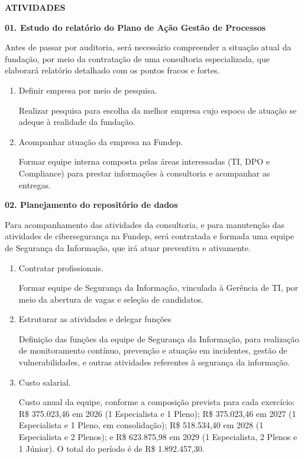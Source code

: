 \documentclass[12pt,a4paper]{article}
\newcommand{\secao}[1]{%
  \par\vspace{6pt}%
  {\noindent\bfseries\color{azulTitulo}\fontsize{13}{16}\selectfont #1}%
  \par\vspace{2pt}%
}
\newcommand{\atividade}[1]{%
  \par{\bfseries\color{azulAtividade}#1}\par
}
\begin{document}
\secao{ATIVIDADES}

\atividade{01. Estudo do relatório do Plano de Ação Gestão de Processos}

Antes de passar por auditoria, será necessário compreender a situação atual da fundação, por meio da contratação de uma consultoria especializada, que elaborará relatório detalhado com os pontos fracos e fortes.

\begin{enumerate}
  \item Definir empresa por meio de pesquisa.

        Realizar pesquisa para escolha da melhor empresa cujo espoco de atuação se adeque à realidade da fundação.
  \item Acompanhar atuação da empresa na Fundep.

        Formar equipe interna composta pelas áreas interessadas (TI, DPO e Compliance) para prestar informações à consultoria e acompanhar as entregas.
\end{enumerate}

\atividade{02. Planejamento do repositório de dados}

Para acompanhamento das atividades da consultoria, e para manutenção das atividades de cibersegurança na Fundep, será contratada e formada uma equipe de Segurança da Informação, que irá atuar preventiva e ativamente.

\begin{enumerate}
  \item Contratar profissionais.

        Formar equipe de Segurança da Informação, vinculada à Gerência de TI, por meio da abertura de vagas e seleção de candidatos.
  \item Estruturar as atividades e delegar funções

        Definição das funções da equipe de Segurança da Informação, para realização de monitoramento contínuo, prevenção e atuação em incidentes, gestão de vulnerabilidades, e outras atividades referentes à segurança da informação.
  \item Custo salarial.

        Custo anual da equipe, conforme a composição prevista para cada exercício: R\$ 375.023,46 em 2026 (1 Especialista e 1 Pleno); R\$ 375.023,46 em 2027 (1 Especialista e 1 Pleno, em consolidação); R\$ 518.534,40 em 2028 (1 Especialista e 2 Plenos); e R\$ 623.875,98 em 2029 (1 Especialista, 2 Plenos e 1 Júnior). O total do período é de R\$ 1.892.457,30.
\end{enumerate}
\end{document}
